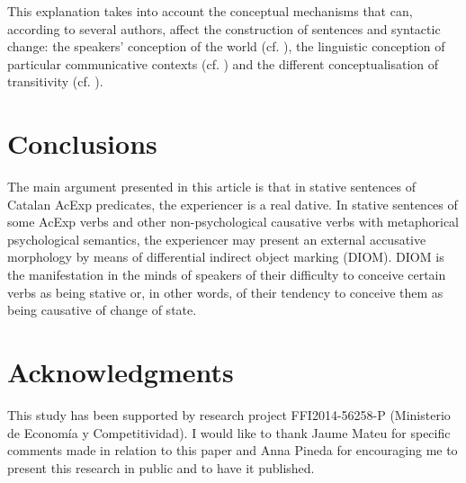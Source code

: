 \documentclass[output=paper,colorlinks,citecolor=brown,nonflat]{./langscibook}
\begin{document}
This explanation takes into account the conceptual mechanisms that can, according to several authors, affect the construction of sentences and syntactic change: the speakers’ conception of the world (cf. \citealt{Ramos2002}), the linguistic conception of particular communicative contexts (cf. \citealt{Rossello2008}) and the different conceptualisation of transitivity (cf. \citealt{Ynglès2011, Pineda2012}).

\section{Conclusions}\label{sec:royo:6}

The main argument presented in this article is that in stative sentences of Catalan AcExp predicates, the experiencer is a real dative. In stative sentences of some AcExp verbs and other non-psychological causative verbs with metaphorical psychological semantics, the experiencer may present an external accusative morphology by means of differential indirect object marking (DIOM). DIOM is the manifestation in the minds of speakers of their difficulty to conceive certain verbs as being stative or, in other words, of their tendency to conceive them as being causative of change of state.

\section*{Acknowledgments} This study has been supported by research project FFI2014-56258-P ({Ministerio de Economía y Competitividad}). I would like to thank Jaume Mateu for specific comments made in relation to this paper and Anna Pineda for encouraging me to present this research in public and to have it published.

\sloppy\printbibliography[heading=subbibliography,notkeyword=this]
\end{document}
